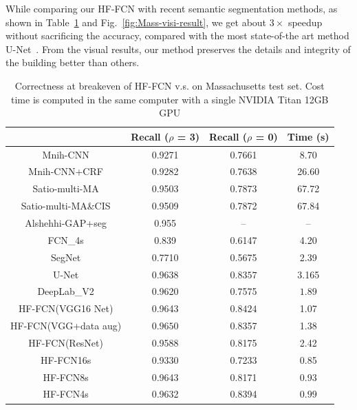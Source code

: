 While comparing our HF-FCN with recent semantic segmentation methods, as shown in Table~\ref{table:Mass-results} and Fig.~\ref{fig:Mass-visi-result}, we get about $3\times$ speedup without sacrificing the accuracy, compared with the most state-of-the art method U-Net~\cite{IEEEexample:ronneberger2015u}.
From the visual results, our method preserves the details and integrity of the building better than others.
\begin{table}
\vspace{-0.2cm}
\setlength{\belowcaptionskip}{-1cm} 
\centering
\caption {Correctness at breakeven of HF-FCN v.s. \cite{IEEEexample:mnih2013machine}\cite{IEEEexample:saito2016multiple}\cite{IEEEexample:alshehhi2017simultaneous}\cite{IEEEexample:Long_2015_CVPR}\cite{IEEEexample:badrinarayanan2017segnet}
\cite{IEEEexample:ronneberger2015u}\cite{IEEEexample:chen2016deeplab}on Massachusetts test set. Cost time is computed in the same computer with a single NVIDIA Titan 12GB GPU}
\label{table:Mass-results}
\begin{tabular}{cccc}
\hline
&Recall ($\rho$ = 3)&Recall ($\rho$ = 0)&Time (s)\\
\hline
Mnih-CNN \cite{IEEEexample:mnih2013machine}&0.9271&0.7661&8.70\\
Mnih-CNN+CRF\cite{IEEEexample:mnih2013machine} &0.9282&0.7638&26.60\\
Satio-multi-MA \cite{IEEEexample:saito2016multiple}&0.9503&0.7873&67.72\\
Satio-multi-MA\&CIS \cite{IEEEexample:saito2016multiple}&0.9509&0.7872&67.84\\
Alshehhi-GAP+seg \cite{IEEEexample:alshehhi2017simultaneous}&0.955&{--}&{--} \\ \hline
FCN\_4s\cite{IEEEexample:Long_2015_CVPR}&0.839&0.6147&4.20\\
SegNet\cite{IEEEexample:badrinarayanan2017segnet}&0.7710&0.5675&2.39\\
U-Net\cite{IEEEexample:ronneberger2015u}& $\bm{0.9638}$& $\bm{0.8357}$& 3.165\\
DeepLab\_V2\cite{IEEEexample:chen2016deeplab}&0.9620&0.7575&$\bm{1.89}$\\ \hline
HF-FCN(VGG16 Net)&0.9643& $\bm{0.8424}$ &1.07\\
HF-FCN(VGG+data aug)&$\bm{0.9650}$&0.8357&1.38\\
HF-FCN(ResNet)&0.9588&0.8175&2.42\\
HF-FCN16s &0.9330&0.7233&0.85\\
HF-FCN8s &0.9643&0.8171&0.93\\
HF-FCN4s &0.9632&0.8394&$\bm{0.99}$\\
\hline
\end{tabular}
\end{table}

